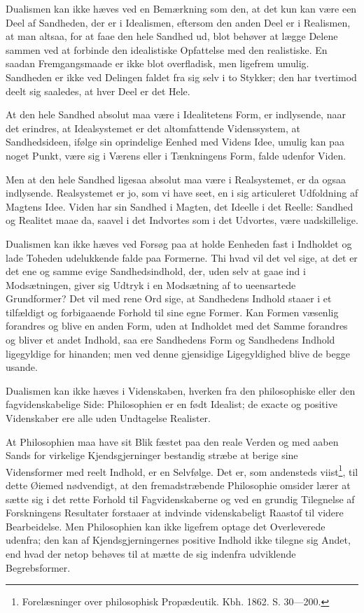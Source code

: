 \documentclass[12pt]{book}
\newcommand{\opage}[1]{\marginnote{\footnotesize\textit{[#1]}}}
\begin{document}
Dualismen kan ikke hæves ved en Bemærkning som den, at det kun kan
være een Deel af Sandheden, der er i Idealismen, eftersom den anden
Deel er i Realismen, at man altsaa, for at faae den hele Sandhed ud,
blot behøver at lægge Delene sammen ved at forbinde den idealistiske
Opfattelse med den realistiske. En saadan Fremgangsmaade er ikke
blot overfladisk, men ligefrem umulig. Sandheden er ikke ved
Delingen faldet fra sig selv i to Stykker; den har tvertimod deelt
sig saaledes, at hver Deel er det Hele.

At den hele Sandhed absolut maa være i Idealitetens Form, er
indlysende, naar det erindres, at Idealsystemet er det altomfattende
Videnssystem, at Sandhedsideen, ifølge sin oprindelige Eenhed med
Videns Idee, umulig kan paa noget Punkt, være sig i Værens eller i
Tænkningens Form, falde udenfor Viden.

Men at den hele Sandhed ligesaa absolut maa være i Realsystemet, er
da ogsaa indlysende. Realsystemet er jo, som vi have seet, en i sig
articuleret Udfoldning af Magtens Idee. Viden har sin Sandhed i
Magten, det Ideelle i det Reelle: Sandhed og Realitet maae da,
saavel i det Indvortes som i det Udvortes, være uadskillelige.

Dualismen kan ikke hæves ved Forsøg paa at holde Eenheden fast i
Indholdet og lade Toheden udelukkende falde paa Formerne. Thi hvad
vil det vel sige, at det er det ene og samme evige Sandhedsindhold,
der, uden selv at gaae ind i Modsætningen, giver sig Udtryk i en
Modsætning af to ueensartede Grundformer? Det vil med rene Ord sige,
at Sandhedens Indhold staaer i et tilfældigt og forbigaaende
\opage{73} Forhold til sine egne Former. Kan Formen væsenlig forandres og blive
en anden Form, uden at Indholdet med det Samme forandres og bliver
et andet Indhold, saa ere Sandhedens Form og Sandhedens Indhold
ligegyldige for hinanden; men ved denne gjensidige Ligegyldighed
blive de begge usande.

Dualismen kan ikke hæves i Videnskaben, hverken fra den
philosophiske eller den fagvidenskabelige Side: Philosophien er en
født Idealist; de exacte og positive Videnskaber ere alle uden
Undtagelse Realister.

At Philosophien maa have sit Blik fæstet paa den reale Verden og med
aaben Sands for virkelige Kjendsgjerninger bestandig stræbe at
berige sine Vidensformer med reelt Indhold, er en Selvfølge. Det er,
som andensteds viist\footnote{Forelæsninger over philosophisk
Propædeutik. Kbh. 1862. S. 30---200.}, til dette Øiemed nødvendigt,
at den fremadstræbende Philosophie omsider lærer at sætte sig i det
rette Forhold til Fagvidenskaberne og ved en grundig Tilegnelse af
Forskningens Resultater forstaaer at indvinde videnskabeligt Raastof
til videre Bearbeidelse. Men Philosophien kan ikke ligefrem optage
det Overleverede udenfra; den kan af Kjendsgjerningernes positive
Indhold ikke tilegne sig Andet, end hvad der netop behøves til at
mætte de sig indenfra udviklende Begrebsformer.
\end{document}
